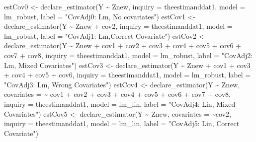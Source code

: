 \documentclass[
  12pt,
]{book}
\newenvironment{Shaded}{\begin{snugshade}}{\end{snugshade}}
\newcommand{\AttributeTok}[1]{\textcolor[rgb]{0.77,0.63,0.00}{#1}}
\newcommand{\FunctionTok}[1]{\textcolor[rgb]{0.00,0.00,0.00}{#1}}
\newcommand{\NormalTok}[1]{#1}
\newcommand{\OtherTok}[1]{\textcolor[rgb]{0.56,0.35,0.01}{#1}}
\newcommand{\SpecialCharTok}[1]{\textcolor[rgb]{0.00,0.00,0.00}{#1}}
\newcommand{\StringTok}[1]{\textcolor[rgb]{0.31,0.60,0.02}{#1}}
\theoremstyle{definition}
\theoremstyle{definition}
\theoremstyle{definition}
\theoremstyle{remark}
\begin{document}
\begin{Shaded}
\begin{Highlighting}[]
\NormalTok{estCov0 }\OtherTok{\textless{}{-}} \FunctionTok{declare\_estimator}\NormalTok{(Y }\SpecialCharTok{\textasciitilde{}}\NormalTok{ Znew, }\AttributeTok{inquiry =}\NormalTok{ theestimanddat1, }\AttributeTok{model =}\NormalTok{ lm\_robust, }\AttributeTok{label =} \StringTok{"CovAdj0: Lm, No covariates"}\NormalTok{)}
\NormalTok{estCov1 }\OtherTok{\textless{}{-}} \FunctionTok{declare\_estimator}\NormalTok{(Y }\SpecialCharTok{\textasciitilde{}}\NormalTok{ Znew }\SpecialCharTok{+}\NormalTok{ cov2, }\AttributeTok{inquiry =}\NormalTok{ theestimanddat1, }\AttributeTok{model =}\NormalTok{ lm\_robust, }\AttributeTok{label =} \StringTok{"CovAdj1: Lm,Correct Covariate"}\NormalTok{)}
\NormalTok{estCov2 }\OtherTok{\textless{}{-}} \FunctionTok{declare\_estimator}\NormalTok{(Y }\SpecialCharTok{\textasciitilde{}}\NormalTok{ Znew }\SpecialCharTok{+}\NormalTok{ cov1 }\SpecialCharTok{+}\NormalTok{ cov2 }\SpecialCharTok{+}\NormalTok{ cov3 }\SpecialCharTok{+}\NormalTok{ cov4 }\SpecialCharTok{+}\NormalTok{ cov5 }\SpecialCharTok{+}\NormalTok{ cov6 }\SpecialCharTok{+}\NormalTok{ cov7 }\SpecialCharTok{+}\NormalTok{ cov8, }\AttributeTok{inquiry =}\NormalTok{ theestimanddat1, }\AttributeTok{model =}\NormalTok{ lm\_robust, }\AttributeTok{label =} \StringTok{"CovAdj2: Lm,  Mixed Covariates"}\NormalTok{)}
\NormalTok{estCov3 }\OtherTok{\textless{}{-}} \FunctionTok{declare\_estimator}\NormalTok{(Y }\SpecialCharTok{\textasciitilde{}}\NormalTok{ Znew }\SpecialCharTok{+}\NormalTok{ cov1 }\SpecialCharTok{+}\NormalTok{ cov3 }\SpecialCharTok{+}\NormalTok{ cov4 }\SpecialCharTok{+}\NormalTok{ cov5 }\SpecialCharTok{+}\NormalTok{ cov6, }\AttributeTok{inquiry =}\NormalTok{ theestimanddat1, }\AttributeTok{model =}\NormalTok{ lm\_robust, }\AttributeTok{label =} \StringTok{"CovAdj3: Lm, Wrong Covariates"}\NormalTok{)}
\NormalTok{estCov4 }\OtherTok{\textless{}{-}} \FunctionTok{declare\_estimator}\NormalTok{(Y }\SpecialCharTok{\textasciitilde{}}\NormalTok{ Znew, }\AttributeTok{covariates =} \SpecialCharTok{\textasciitilde{}}\NormalTok{ cov1 }\SpecialCharTok{+}\NormalTok{ cov2 }\SpecialCharTok{+}\NormalTok{ cov3 }\SpecialCharTok{+}\NormalTok{ cov4 }\SpecialCharTok{+}\NormalTok{ cov5 }\SpecialCharTok{+}\NormalTok{ cov6 }\SpecialCharTok{+}\NormalTok{ cov7 }\SpecialCharTok{+}\NormalTok{ cov8, }\AttributeTok{inquiry =}\NormalTok{ theestimanddat1, }\AttributeTok{model =}\NormalTok{ lm\_lin, }\AttributeTok{label =} \StringTok{"CovAdj4: Lin, Mixed Covariates"}\NormalTok{)}
\NormalTok{estCov5 }\OtherTok{\textless{}{-}} \FunctionTok{declare\_estimator}\NormalTok{(Y }\SpecialCharTok{\textasciitilde{}}\NormalTok{ Znew, }\AttributeTok{covariates =} \SpecialCharTok{\textasciitilde{}}\NormalTok{cov2, }\AttributeTok{inquiry =}\NormalTok{ theestimanddat1, }\AttributeTok{model =}\NormalTok{ lm\_lin, }\AttributeTok{label =} \StringTok{"CovAdj5: Lin, Correct Covariate"}\NormalTok{)}
\end{Highlighting}
\end{Shaded}
\end{document}

